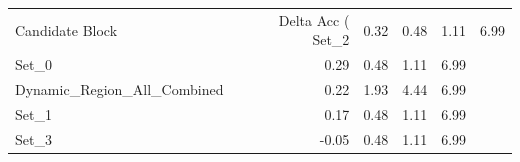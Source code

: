 \begin{tabular}{lrrrr}
\toprule
Candidate Block & Delta Acc (%
\midrule
Set_2 & 0.32 & 0.48 & 1.11 & 6.99 \\
Set_0 & 0.29 & 0.48 & 1.11 & 6.99 \\
Dynamic_Region_All_Combined & 0.22 & 1.93 & 4.44 & 6.99 \\
Set_1 & 0.17 & 0.48 & 1.11 & 6.99 \\
Set_3 & -0.05 & 0.48 & 1.11 & 6.99 \\
\bottomrule
\end{tabular}
